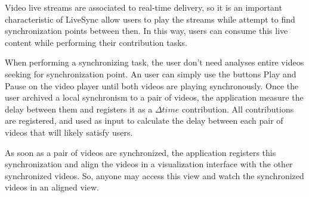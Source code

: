 
Video live streams are associated to real-time delivery, so it is an important characteristic of LiveSync allow users to play the streams while attempt to find synchronization points between then. In this way, users can consume this live content while performing their contribution tasks.

When performing a synchronizing task, the user don't need analyses entire videos seeking for synchronization point. An user can simply use the buttons Play and Pause on the video player until both videos are playing synchronously. Once the user archived a local synchronism to a pair of videos, the application measure the delay between them and registers it as a $\Delta{time}$ contribution. All contributions are registered, and used as input to calculate the delay between each pair of videos that will likely satisfy users.

As soon as a pair of videos are synchronized, the application registers this synchronization and align the videos in a visualization interface with the other synchronized videos. So, anyone may access this view and watch the synchronized videos in an aligned view.
